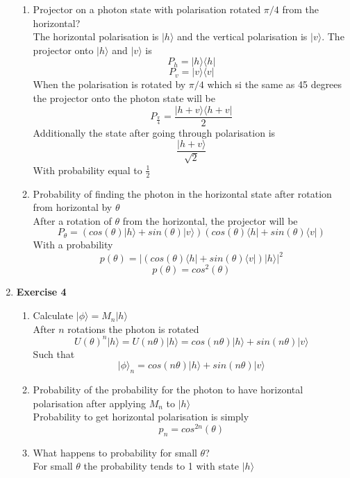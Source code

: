 \documentclass[12pt]{article}
\newcommand{\ket}[1]{\vert{#1}\rangle}
\newcommand{\bra}[1]{\langle{#1}\vert}
\begin{document}
\begin{enumerate}
\begin{enumerate}
    \item Projector on a photon state with polarisation rotated $\pi /4$ from the horizontal? \\
    The horizontal polarisation is $\ket{h}$ and the vertical polarisation is $\ket{v}$. The projector onto $\ket{h}$ and $\ket{v}$ is 
    $$ P_h = \ket{h} \bra{h} $$
    $$ P_v = \ket{v} \bra{v} $$
    When the polarisation is rotated by $\pi /4$ which si the same as 45 degrees the projector onto the photon state will be 
    $$ P_{\frac{\pi}{4}} = \frac{\ket{h + v} \bra{h+v}}{2} $$
    Additionally the state after going through polarisation is 
    $$ \frac{\ket{h+v}}{\sqrt{2}} $$ 
    With probability equal to $\frac{1}{2}$ 
    
    \item Probability of finding the photon in the horizontal state after rotation from horizontal by $\theta$ \\
    After a rotation of $\theta$ from the horizontal, the projector will be 
    $$ P_{\theta} = (cos(\theta) \ket{h} + sin(\theta)\ket{v})(cos(\theta) \bra{h} + sin(\theta) \bra{v}) $$
    With a probability 
    $$ p(\theta) = |(cos(\theta) \bra{h} + sin(\theta) \bra{v}) \ket{h} |^2 $$
    $$ p(\theta) = cos^2(\theta) $$
    
\end{enumerate}

\item \textbf{Exercise 4} 
\begin{enumerate}
    \item Calculate $\ket{\phi} = M_n \ket{h}$\\
    After $n$ rotations the photon is rotated 
    $$ U(\theta)^n \ket{h} = U(n \theta) \ket{h} = cos(n \theta) \ket{h} + sin(n \theta) \ket{v} $$
    Such that 
    $$\ket{\phi}_n = cos(n \theta) \ket{h} + sin(n \theta) \ket{v}$$
   
    
    \item Probability of the probability for the photon to have horizontal polarisation after applying $M_n$ to $\ket{h}$\\
    Probability to get horizontal polarisation is simply 
    $$ p_n = cos^{2n} (\theta) $$
    
    \item What happens to probability for small $\theta$? \\
    For small $\theta$ the probability tends to 1 with state $\ket{h}$
\end{enumerate}


\end{enumerate}
\end{document}
